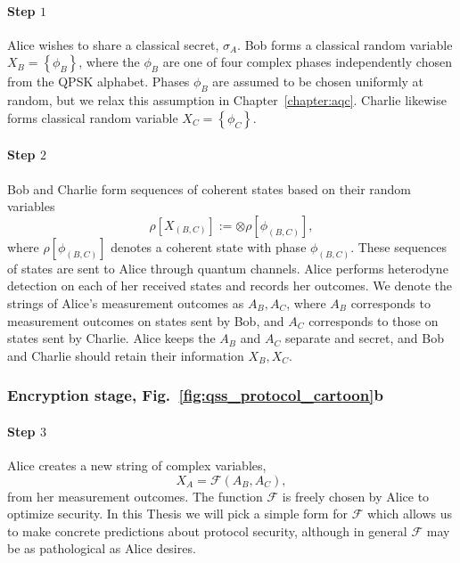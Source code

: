 \paragraph{Step $1$}
Alice wishes to share a classical secret, $\sigma_A$. Bob forms a classical random variable $X_B = \left\{\phi_B\right\}$, where the $\phi_B$ are one of four complex phases independently chosen from the QPSK alphabet. Phases $\phi_B$ are assumed to be chosen uniformly at random, but we relax this assumption in Chapter~\ref{chapter:aqc}. Charlie likewise forms classical random variable $X_C = \left\{\phi_C\right\}$.

\paragraph{Step $2$}
Bob and Charlie form sequences of coherent states based on their random variables
\begin{equation}
\rho\left[X_{\left(B, C\right)}\right] := \otimes \rho\left[\phi_{\left(B, C\right)}\right],
\end{equation}
where $\rho\left[\phi_{\left(B, C\right)}\right]$ denotes a coherent state with phase $\phi_{\left(B, C\right)}$. These sequences of states are sent to Alice through quantum channels. %
Alice performs heterodyne detection on each of her received states and records her outcomes. We denote the strings of Alice's measurement outcomes as $A_B, A_C$, where $A_B$ corresponds to measurement outcomes on states sent by Bob, and $A_C$ corresponds to those on states sent by Charlie. Alice keeps the $A_B$ and $A_C$ separate and secret, and Bob and Charlie should retain their information $X_B, X_C$.

\subsubsection*{Encryption stage, Fig.~\ref{fig:qss_protocol_cartoon}b}

\paragraph{Step $3$} Alice creates a new string of complex variables,
\begin{equation}
X_A = \mathcal{F}\left(A_B, A_C\right),
\end{equation}
from her measurement outcomes. The function $\mathcal{F}$ is freely chosen by Alice to optimize security. In this Thesis we will pick a simple form for $\mathcal{F}$ which allows us to make concrete predictions about protocol security, although in general $\mathcal{F}$ may be as pathological as Alice desires.


